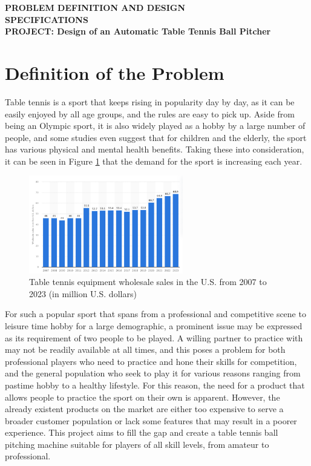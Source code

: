 \documentclass[12pt]{article}
\begin{document}
\begin{center}
    \vspace{1em}
    \textbf{\LARGE PROBLEM DEFINITION AND DESIGN\\ \vspace{8pt}SPECIFICATIONS}\\
    \vspace{1em}
    \textbf{PROJECT: Design of an Automatic Table Tennis Ball Pitcher}
\end{center}

\section{Definition of the Problem}
Table tennis is a sport that keeps rising in popularity day by day, as it can be easily enjoyed by all age groups, and the rules are easy to pick up. Aside from being an Olympic sport, it is also widely played as a hobby by a large number of people, and some studies even suggest that for children and the elderly, the sport has various physical and mental health benefits. Taking these into consideration, it can be seen in Figure \ref{fig:wholesales} that the demand for the sport is increasing each year.

\begin{figure}[H]
    \centering
    \includegraphics[width=0.6\textwidth]{figures/wholesales.png}
    \caption{Table tennis equipment wholesale sales in the U.S. from 2007 to 2023 (in million U.S. dollars) \cite{statista2024}}
    \label{fig:wholesales}
\end{figure}

For such a popular sport that spans from a professional and competitive scene to leisure time hobby for a large demographic, a prominent issue may be expressed as its requirement of two people to be played. A willing partner to practice with may not be readily available at all times, and this poses a problem for both professional players who need to practice and hone their skills for competition, and the general population who seek to play it for various reasons ranging from pastime hobby to a healthy lifestyle. For this reason, the need for a product that allows people to practice the sport on their own is apparent. However, the already existent products on the market are either too expensive to serve a broader customer population or lack some features that may result in a poorer experience. This project aims to fill the gap and create a table tennis ball pitching machine suitable for players of all skill levels, from amateur to professional. \\
\end{document}
